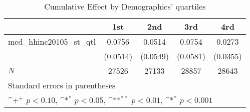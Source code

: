 \begin{table}[htbp]\centering
\def\sym#1{\ifmmode^{#1}\else\(^{#1}\)\fi}
\caption{Cumulative Effect by Demographics' quartiles}
\begin{tabular}{l*{4}{c}}
\hline\hline
            &\multicolumn{1}{c}{1st}&\multicolumn{1}{c}{2nd}&\multicolumn{1}{c}{3rd}&\multicolumn{1}{c}{4rd}\\
\hline
med\_hhinc20105\_st\_qtl&      0.0756       &      0.0514       &      0.0754       &      0.0273       \\
            &    (0.0514)       &    (0.0549)       &    (0.0581)       &    (0.0355)       \\
\hline
\(N\)       &       27526       &       27133       &       28857       &       28643       \\
\hline\hline
\multicolumn{5}{l}{\footnotesize Standard errors in parentheses}\\
\multicolumn{5}{l}{\footnotesize \sym{+} \(p<0.10\), \sym{*} \(p<0.05\), \sym{**} \(p<0.01\), \sym{*} \(p<0.001\)}\\
\end{tabular}
\end{table}
